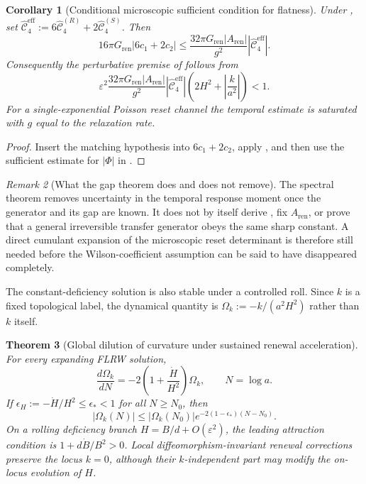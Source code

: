\documentclass[11pt]{article}
\newtheorem{theorem}{Theorem}[section]
\newtheorem{corollary}[theorem]{Corollary}
\theoremstyle{definition}
\theoremstyle{remark}
\newtheorem{remark}[theorem]{Remark}
\newcommand{\eps}{\varepsilon}
\newcommand{\eff}{\mathrm{eff}}
\newcommand{\ren}{\mathrm{ren}}
\newcommand{\Gren}{G_{\mathrm{ren}}}
\begin{document}
\begin{corollary}[Conditional microscopic sufficient condition for flatness]
\label{cor:microscopic-flatness-bound}
Under , set
$\widehat{\mathcal C}^{\eff}_4:=6\widehat{\mathcal C}^{(R)}_4+
2\widehat{\mathcal C}^{(S)}_4$.  Then
\[
 16\pi\Gren|6c_1+2c_2|
 \le \frac{32\pi\Gren|A_{\ren}|}{g^2}
       |\widehat{\mathcal C}^{\eff}_4|.
\]
Consequently the perturbative premise of  follows
from
\[
 \eps^2\frac{32\pi\Gren|A_{\ren}|}{g^2}
 |\widehat{\mathcal C}^{\eff}_4|
 \left(2H^2+\left|\frac{k}{a^2}\right|\right)<1.
\]
For a single-exponential Poisson reset channel the temporal estimate is
saturated with $g$ equal to the relaxation rate.
\end{corollary}

\begin{proof}
Insert the matching hypothesis into $6c_1+2c_2$, apply
, and then use the sufficient estimate for
$|\Phi|$ in .
\end{proof}

\begin{remark}[What the gap theorem does and does not remove]
\label{rem:gap-matching-scope}
The spectral theorem removes uncertainty in the temporal response moment once
the generator and its gap are known.  It does not by itself derive
, fix $A_{\ren}$, or prove that a general
irreversible transfer generator obeys the same sharp constant.  A direct
cumulant expansion of the microscopic reset determinant is therefore still
needed before the Wilson-coefficient assumption can be said to have disappeared
completely.
\end{remark}

The constant-deficiency solution is also stable under a controlled roll.  Since
$k$ is a fixed topological label, the dynamical quantity is
$\Omega_k:=-k/(a^2H^2)$ rather than $k$ itself.

\begin{theorem}[Global dilution of curvature under sustained renewal acceleration]
\label{thm:global-renewal-flattening}
For every expanding FLRW solution,
\[
 \frac{d\Omega_k}{dN}
 =-2\left(1+\frac{\dot H}{H^2}\right)\Omega_k,
 \qquad N=\log a.
\]
If $\epsilon_H:=-\dot H/H^2\le\epsilon_*<1$ for all
$N\ge N_0$, then
\[
 |\Omega_k(N)|\le |\Omega_k(N_0)|
 e^{-2(1-\epsilon_*)(N-N_0)}.
\]
On a rolling deficiency branch $H=B/d+O(\eps^2)$, the leading attraction
condition is $1+d\dot B/B^2>0$.  Local diffeomorphism-invariant renewal
corrections preserve the locus $k=0$, although their $k$-independent part may
modify the on-locus evolution of $H$.
\end{theorem}
\end{document}
